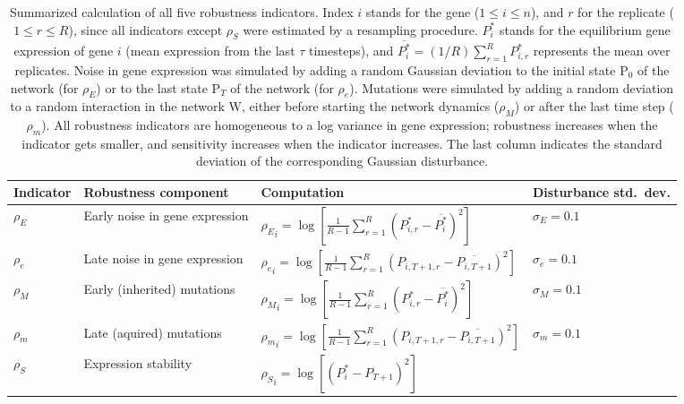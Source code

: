 \documentclass[10pt,a4paper]{article}
\newcommand{\stability}{{\rho_S}}
\newcommand{\earlyenv}{{\rho_E}}
\newcommand{\lateenv}{{\rho_e}}
\newcommand{\earlymut}{{\rho_M}}
\newcommand{\latemut}{{\rho_m}}
\newcommand{\Pp}{\bm{\mathrm P}}
\begin{document}
\begin{table}
\begin{adjustwidth}{-1in}{0in}
\begin{flushright}
\begin{tabular}{lp{3.5cm}ll}
Indicator & Robustness component & Computation & Disturbance std.\ dev. \\ \hline
$\earlyenv$ & \raggedright  Early noise in gene \mbox{expression} & $\earlyenv_i = \log [ \frac{1}{R-1} \sum_{r=1}^R (P_{i,r}^* - \overline{P_{i}^*})^2 ]$ & $\sigma_E=0.1$\\
$\lateenv$  & \raggedright  Late noise in gene \mbox{expression} & $\lateenv_i = \log [ \frac{1}{R-1} \sum_{r=1}^R (P_{i,T+1,r} - \overline{P_{i,T+1}})^2]$ & $\sigma_e=0.1$\\
$\earlymut$ & \raggedright  Early (inherited) \mbox{mutations} & $\earlymut_i = \log[ \frac{1}{R-1} \sum_{r=1}^R (P_{i,r}^* - \overline{P_{i}^*})^2]$ & $\sigma_M = 0.1$\\
$\latemut$ & \raggedright  Late (aquired) \mbox{mutations} & $\latemut_i = \log [ \frac{1}{R-1} \sum_{r=1}^R (P_{i,T+1,r} - \overline{P_{i,T+1}})^2]$ & $\sigma_m = 0.1$ \\
$\stability$ & \raggedright Expression stability & $\stability_i = \log[( P_i^* - P_{T+1})^2]$ & \\
\end{tabular}
\caption{\color{Gray}  \label{tab:indicators} Summarized calculation of all five robustness indicators. Index $i$ stands for the gene ($1 \leq i \leq n$), and $r$ for the replicate ($1 \leq r \leq R$), since all indicators except $\stability$ were estimated by a resampling procedure. $P_i^*$ stands for the equilibrium gene expression of gene $i$ (mean expression from the last $\tau$ timesteps), and $\overline{P_{i}^*} = (1/R)\sum_{r=1}^R P_{i,r}^*$ represents the mean over replicates. Noise in gene expression was simulated by adding a random Gaussian deviation to the initial state $\Pp_0$ of the network (for $\earlyenv$) or to the last state $\Pp_T$ of the network (for $\lateenv$). Mutations were simulated by adding a random deviation to a random interaction in the network $\bm{\mathrm W}$, either before starting the network dynamics ($\earlymut$) or after the last time step ($\latemut$). All robustness indicators are homogeneous to a log variance in gene expression; robustness increases when the indicator gets smaller, and sensitivity increases when the indicator increases. The last column indicates the standard deviation of the corresponding Gaussian disturbance. }
\end{flushright}\end{adjustwidth}
\end{table}
\end{document}
